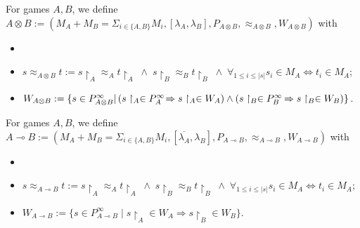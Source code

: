 \documentclass[runningheads,a4paper]{llncs}
\begin{document}
\begin{definition}[Tensor] For games $A,B$, we define\newline $A\otimes B:=(M_A+M_B=\Sigma_{i\in \{A,B\}}M_i,[\lambda_A,\lambda_B],P_{A\otimes B},\approx_{A\otimes B},W_{A\otimes B})$ with
\begin{itemize}
\item {}
\item $s\approx_{A\otimes B} t:= s\upharpoonright_A \approx_A t\upharpoonright_A \;\wedge \; s\upharpoonright_B\approx_B t\upharpoonright_B\;\wedge\; \forall_{1\leq i\leq |s|} s_i\in M_A\Leftrightarrow t_i\in M_A$;
\item $W_{A\otimes B} :=\{s\in P_{A\otimes B}^\infty|\left(s\upharpoonright_A\in P_A^\infty \hspace{-2pt}\Rightarrow s\upharpoonright_A\in W_A\right)\wedge\left( s\upharpoonright_B\in P_B^\infty\hspace{-1pt} \Rightarrow s\upharpoonright_B\in W_B\right)\}$.
\end{itemize}
\end{definition}
\begin{definition} For games $A,B$, we define\\ $A\multimap B:=(M_A+M_B=\Sigma_{i\in \{A,B\}}M_i,[\overline{\lambda_A},\lambda_B],P_{A\multimap B},\approx_{A\multimap B},W_{A\multimap B})$ with
\begin{itemize}
\item {}
\item $s\approx_{A\multimap B} t:= s\upharpoonright_A \approx_A t\upharpoonright_A \;\wedge \; s\upharpoonright_B\approx_B t\upharpoonright_B\;\wedge\; \forall_{1\leq i\leq |s|} s_i\in M_A\Leftrightarrow t_i\in M_A$;
\item $W_{A\multimap B}:=\{s\in P_{A\multimap B}^\infty\;|\; s\upharpoonright_A\in W_A \Rightarrow s\upharpoonright_B\in W_B\}$.
\end{itemize}
\end{definition}
\end{document}
